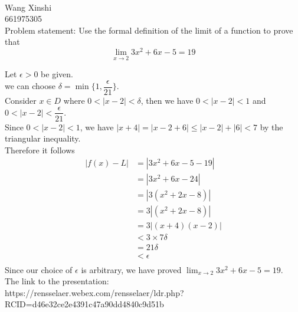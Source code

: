 \documentclass{article}
\begin{document}
\\
Wang Xinshi\\
661975305\\

\noindent Problem statement: Use the formal definition of the limit of a function to prove that $$\lim_{x \to 2} 3x^2+6x-5 = 19$$

\noindent {} Let $\epsilon>0$ be given.\\
we can choose $\delta = \min \{1,\dfrac{\epsilon}{21}\}$.\\
Consider $x \in D$ where $0<|x-2|<\delta$, then we have $0<|x-2|<1$ and $0<|x-2|<\dfrac{\epsilon}{21}$.\\
Since $0<|x-2|<1$, we have $|x+4| = |x-2+6| \leq |x-2|+|6| < 7$ by the triangular inequality.\\
Therefore it follows
\begin{align*}
	|f(x)-L|&=|3x^2+6x-5-19|\\
	&=|3x^2+6x-24|\\
	&=|3(x^2+2x-8)|\\
	&=3|(x^2+2x-8)|\\
	&=3|(x+4)(x-2)|\\
	&<3\times7\delta\\
	&=21\delta\\
	&<\epsilon\\
\end{align*}
Since our choice of $\epsilon$ is arbitrary, we have proved $\lim_{x \to 2} 3x^2+6x-5 = 19$.\\

\noindent The link to the presentation:\\
https://rensselaer.webex.com/rensselaer/ldr.php?RCID=d46e32ce2e4391c47a90dd4840c9d51b
\end{document}
